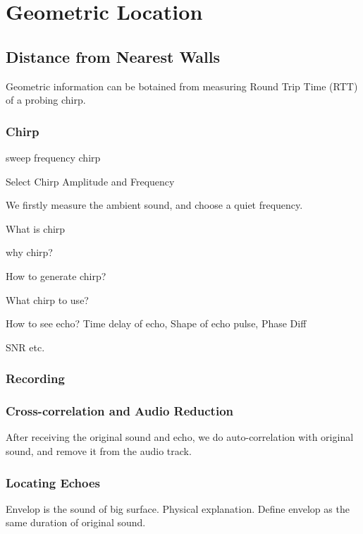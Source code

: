 \section{Geometric Location}
\label{sec:geo}



\subsection{Distance from Nearest Walls}

Geometric information can be botained from measuring Round Trip Time (RTT)
of a probing chirp. 

\subsubsection{Chirp}


sweep frequency chirp


Select Chirp Amplitude and Frequency

We firstly measure the ambient sound, and choose a quiet frequency.


What is chirp


why chirp?


How to generate chirp?


What chirp to use?


How to see echo? Time delay of echo, Shape of echo pulse, Phase Diff


SNR etc.


\subsubsection{Recording}

\subsubsection{Cross-correlation and Audio Reduction}

After receiving the original sound and echo, we do auto-correlation with original sound,
and remove it from the audio track.



\subsubsection{Locating Echoes}

Envelop is the sound of big surface. Physical explanation. 
Define envelop as the same duration of original sound.



